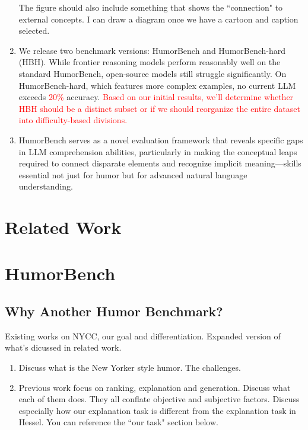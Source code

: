 \documentclass[11pt]{article}
\begin{document}
\begin{enumerate}
The figure should also include something that shows the ``connection" to external concepts. I can draw a diagram once we have a cartoon and caption selected.

\item We release two benchmark versions: HumorBench and HumorBench-hard (HBH). While frontier reasoning models perform reasonably well on the standard HumorBench, open-source models still struggle significantly. On HumorBench-hard, which features more complex examples, no current LLM exceeds \textcolor{red}{20\%} accuracy. \textcolor{red}{Based on our initial results, we'll determine whether HBH should be a distinct subset or if we should reorganize the entire dataset into difficulty-based divisions.}

\item HumorBench serves as a novel evaluation framework that reveals specific gaps in LLM comprehension abilities, particularly in making the conceptual leaps required to connect disparate elements and recognize implicit meaning—skills essential not just for humor but for advanced natural language understanding.

\end{enumerate}

\section{Related Work}

\section{HumorBench}

\subsection{Why Another Humor Benchmark?}
Existing works on NYCC, our goal and differentiation. Expanded version of what's dicussed in related work.

\begin{enumerate}
    \item Discuss what is the New Yorker style humor. The challenges.

    \item Previous work focus on ranking, explanation and generation. Discuss what each of them does. They all conflate objective and subjective factors. Discuss especially how our explanation task is different from the explanation task in Hessel. You can reference the ``our task" section below.
\end{enumerate}
\end{document}
